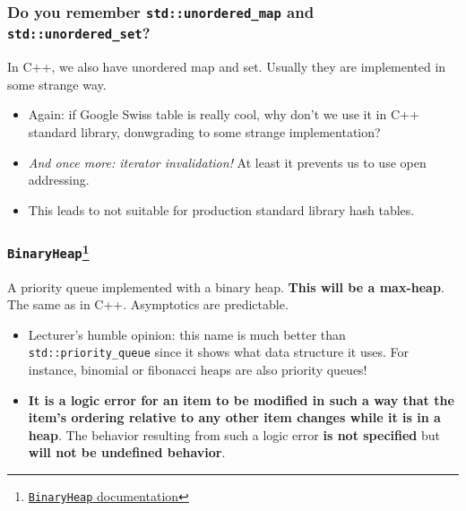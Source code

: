 \documentclass[aspectratio=1610,t]{beamer}
\begin{document}

\begin{frame}[fragile]
\frametitle{Do you remember \texttt{std::unordered\_map} and \texttt{std::unordered\_set}?}
In C++, we also have unordered map and set. Usually they are implemented in some strange way.

\begin{itemize}
    \item<2-> Again: if Google Swiss table is really cool, why don't we use it in C++ standard library, donwgrading to some strange implementation?
    \item<3-> \textit{And once more: iterator invalidation!} At least it prevents us to use open addressing.
    \item<4-> This leads to not suitable for production standard library hash tables.
\end{itemize}
\end{frame}


\begin{frame}[fragile]
\frametitle{\texttt{BinaryHeap}\footnote{\href{https://doc.rust-lang.org/stable/std/collections/struct.BinaryHeap.html}{\texttt{BinaryHeap} documentation}}}
A priority queue implemented with a binary heap. \textbf{This will be a max-heap}. The same as in C++. Asymptotics are predictable.

\begin{itemize}
    \item<2-> Lecturer's humble opinion: this name is much better than \texttt{std::priority\_queue} since it shows what data structure it uses. For instance, binomial or fibonacci heaps are also priority queues!
    \item<3-> \textbf{It is a logic error for an item to be modified in such a way that the item’s ordering relative to any other item changes while it is in a heap}. The behavior resulting from such a logic error \textbf{is not specified} but \textbf{will not be undefined behavior}.
\end{itemize}
\end{frame}

\end{document}
